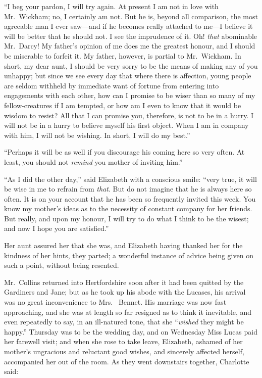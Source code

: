 ``I beg your pardon, I will try again.  At present I am not in
love with Mr.\ Wickham; no, I certainly am not.  But he is, beyond
all comparison, the most agreeable man I ever saw---and if he
becomes really attached to me---I believe it will be better that
he should not.  I see the imprudence of it.  Oh! \emph{that} abominable
Mr.\ Darcy!  My father's opinion of me does me the greatest
honour, and I should be miserable to forfeit it.  My father,
however, is partial to Mr.\ Wickham.  In short, my dear aunt,
I should be very sorry to be the means of making any of you
unhappy; but since we see every day that where there is
affection, young people are seldom withheld by immediate want
of fortune from entering into engagements with each other, how
can I promise to be wiser than so many of my fellow-creatures
if I am tempted, or how am I even to know that it would be
wisdom  to resist?  All that I can promise you, therefore, is not
to be in a hurry.  I will not be in a hurry to believe myself his
first object.  When I am in company with him, I will not be
wishing.  In short, I will do my best.''

``Perhaps it will be as well if you discourage his coming here so
very often.  At least, you should not \emph{remind} you mother of
inviting him.''

``As I did the other day,'' said Elizabeth with a conscious smile:
``very true, it will be wise in me to refrain from \emph{that}.  But do
not imagine that he is always here so often.  It is on your
account that he has been so frequently invited this week.  You
know my mother's ideas as to the necessity of constant company
for her friends.  But really, and upon my honour, I will try to do
what I think to be the wisest; and now I hope you are satisfied.''

Her aunt assured her that she was, and Elizabeth having thanked
her for the kindness of her hints, they parted; a wonderful
instance of advice being given on such a point, without being
resented.

Mr.\ Collins returned into Hertfordshire soon after it had been
quitted by the Gardiners and Jane; but as he took up his abode
with the Lucases, his arrival was no great inconvenience to Mrs.\ %
Bennet.  His marriage was now fast approaching, and she was at
length so far resigned as to think it inevitable, and even
repeatedly to say, in an ill-natured tone, that she ``\emph{wished} they
might be happy.''  Thursday was to be the wedding day, and on
Wednesday Miss Lucas paid her farewell visit; and when she
rose to take leave, Elizabeth, ashamed of her mother's
ungracious and reluctant good wishes, and sincerely affected
herself, accompanied her out of the room.  As they went
downstairs together, Charlotte said:

